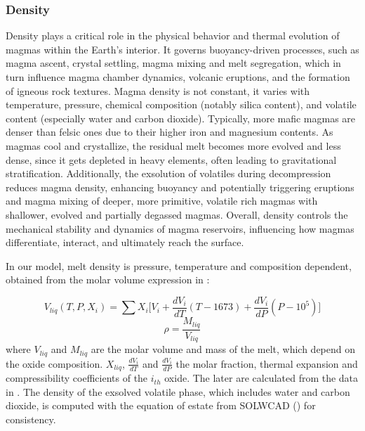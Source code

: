 \subsubsection{Density}
Density plays a critical role in the physical behavior and thermal evolution of magmas within the Earth's interior. It governs buoyancy-driven processes, such as magma ascent, crystal settling, magma mixing and melt segregation, which in turn influence magma chamber dynamics, volcanic eruptions, and the formation of igneous rock textures. Magma density is not constant, it varies with temperature, pressure, chemical composition (notably silica content), and volatile content (especially water and carbon dioxide). Typically, more mafic magmas are denser than felsic ones due to their higher iron and magnesium contents. As magmas cool and crystallize, the residual melt becomes more evolved and less dense, since it gets depleted in heavy elements, often leading to gravitational stratification. Additionally, the exsolution of volatiles during decompression reduces magma density, enhancing buoyancy and potentially triggering eruptions and magma mixing of deeper, more primitive, volatile rich magmas with shallower, evolved and partially degassed magmas. Overall, density controls the mechanical stability and dynamics of magma reservoirs, influencing how magmas differentiate, interact, and ultimately reach the surface.

In our model, melt density is pressure, temperature and composition dependent, obtained from the molar volume expression in \cite{lange1990}:

\begin{equation}
    V_{liq}(T,P,X_i) = \sum X_i \bigg[V_i + \frac{dV_i}{dT} (T-1673) + \frac{dV_i}{dP}(P-10^5)\bigg]
\end{equation}
\begin{equation}
    \rho = \frac{M_{liq}}{V_{liq}}
\end{equation}
where $V_{liq}$ and $M_{liq}$ are the molar volume and mass of the melt, which depend on the oxide composition. $X_{liq}$, $\frac{dV_i}{dT}$ and $ \frac{dV_i}{dP}$ the molar fraction, thermal expansion and compressibility coefficients of the $i_{th}$ oxide. The later are calculated from the data in \cite{lesher2015}.
The density of the exsolved volatile phase, which includes water and carbon dioxide, is computed with the equation of estate from SOLWCAD (\cite{papale2006}) for consistency.

